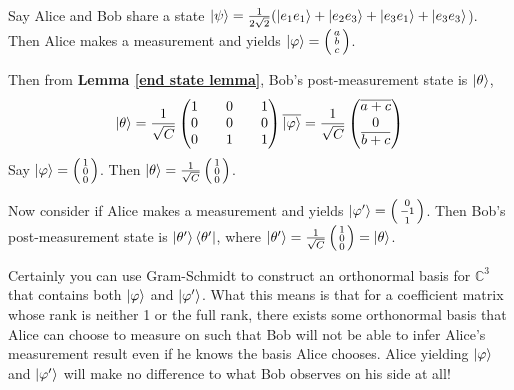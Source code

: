 \begin{example}
Say Alice and Bob share a state $\ket{\psi}=\frac{1}{2\sqrt{2}}(\ket{e_1 e_1}+\ket{e_2 e_3}+\ket{e_3 e_1}+\ket{e_3 e_3}$). Then Alice makes a measurement and yields $\ket{\varphi}=\left(\begin{smallmatrix}a\\b\\c\end{smallmatrix}\right)$.

Then from \textbf{Lemma \ref{end state lemma}}, Bob's post-measurement state is $\ket{\theta}$,
\begin{equation}
\ket{\theta}=\frac{1}{\sqrt{C}}\begin{pmatrix}
1 && 0 && 1\\
0 && 0 && 0\\
0 && 1 && 1\\
\end{pmatrix}\overline{\ket{\varphi}}=\frac{1}{\sqrt{C}}\begin{pmatrix}
\overline{a+c}\\
0\\
\overline{b+c}
\end{pmatrix}
\end{equation}
Say $\ket{\varphi}=\left(\begin{smallmatrix}1\\0\\0\end{smallmatrix}\right)$. Then $\ket{\theta}=\frac{1}{\sqrt{C}}\left(\begin{smallmatrix}1\\0\\0\end{smallmatrix}\right)$.

Now consider if Alice makes a measurement and yields $\ket{\varphi'}=\left(\begin{smallmatrix}0\\-1\\1\end{smallmatrix}\right)$. Then Bob's post-measurement state is $\ket{\theta'}\bra{\theta'}$, where $\ket{\theta'}=\frac{1}{\sqrt{C}}\left(\begin{smallmatrix}1\\0\\0\end{smallmatrix}\right)=\ket{\theta}$.

Certainly you can use Gram-Schmidt to construct an orthonormal basis for $\mathbb{C}^3$ that contains both $\ket{\varphi}$ and $\ket{\varphi'}$. What this means is that for a coefficient matrix whose rank is neither 1 or the full rank, there exists some orthonormal basis that Alice can choose to measure on such that Bob will not be able to infer Alice's measurement result even if he knows the basis Alice chooses. Alice yielding $\ket{\varphi}$ and $\ket{\varphi'}$ will make no difference to what Bob observes on his side at all!


\end{example}
